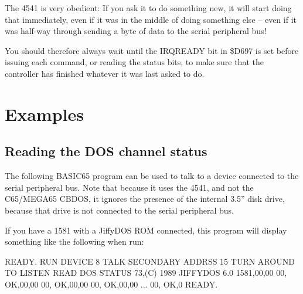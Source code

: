 The 4541 is very obedient: If you ask it to do something new, it
will start doing that immediately, even if it was in the middle of
doing something else -- even if it was half-way through sending a byte
of data to the serial peripheral bus!  

You should therefore always wait until the IRQREADY bit in \$D697 is
set before issuing each command, or reading the status bits, to make
sure that the controller has finished whatever it was last asked to
do.

\section{Examples}

\subsection{Reading the DOS channel status}

The following BASIC65 program can be used to talk to a device
connected to the serial peripheral bus. Note that because it uses the
4541, and not the C65/MEGA65 CBDOS, it ignores the presence of the
internal 3.5'' disk drive, because that drive is not connected to the
serial peripheral bus.


If you have a 1581 with a JiffyDOS{\texttrademark} ROM connected, this
program will display something like the following when run:

\begin{screencode}
READY.
RUN
DEVICE 8 TALK
SECONDARY ADDRSS 15
TURN AROUND TO LISTEN
READ DOS STATUS
73,(C) 1989 JIFFYDOS 6.0 1581,00,00
00, OK,00,00
00, OK,00,00
00, OK,00,00
...
00, OK,0
READY.
\end{screencode}

